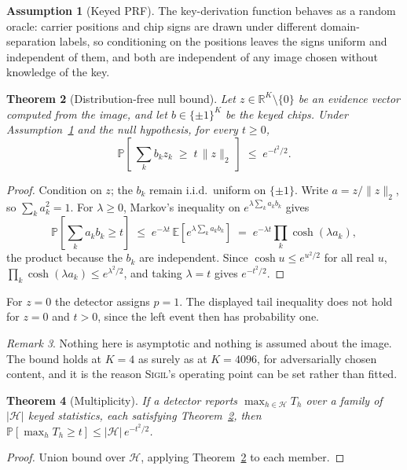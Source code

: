 \documentclass[10pt,twocolumn]{article}
\newtheorem{theorem}{Theorem}
\theoremstyle{definition}
\newtheorem{assumption}[theorem]{Assumption}
\theoremstyle{remark}
\newtheorem{remark}[theorem]{Remark}
\newcommand{\R}{\mathbb{R}}
\newcommand{\E}{\mathbb{E}}
\renewcommand{\Pr}{\mathbb{P}}
\newcommand{\sigil}{\textsc{Sigil}}
\begin{document}
\begin{assumption}[Keyed PRF]
\label{ass:prf}
The key-derivation function behaves as a random oracle: carrier positions and
chip signs are drawn under different domain-separation labels, so conditioning on
the positions leaves the signs uniform and independent of them, and both are
independent of any image chosen without knowledge of the key.
\end{assumption}

\begin{theorem}[Distribution-free null bound]
\label{thm:null}
Let $z\in\R^{K}\setminus\{0\}$ be an evidence vector computed from the image, and let
$b\in\{\pm1\}^{K}$ be the keyed chips. Under Assumption~\ref{ass:prf} and the
null hypothesis, for every $t\geq0$,
\[
  \Pr\!\left[\ \sum_k b_k z_k \;\geq\; t\,\lVert z\rVert_2 \ \right] \;\leq\; e^{-t^{2}/2}.
\]
\end{theorem}

\begin{proof}
Condition on $z$; the $b_k$ remain i.i.d.\ uniform on $\{\pm1\}$. Write
$a=z/\lVert z\rVert_2$, so $\sum_k a_k^2=1$. For $\lambda\geq0$, Markov's
inequality on $e^{\lambda\sum_k a_kb_k}$ gives
\[
  \Pr[\textstyle\sum_k a_kb_k\geq t]
  \;\leq\; e^{-\lambda t}\,\E\!\left[e^{\lambda\sum_k a_kb_k}\right]
  \;=\; e^{-\lambda t}\prod_k \cosh(\lambda a_k),
\]
the product because the $b_k$ are independent. Since
$\cosh u\leq e^{u^{2}/2}$ for all real $u$,
$\prod_k\cosh(\lambda a_k)\leq e^{\lambda^{2}/2}$, and taking $\lambda=t$ gives
$e^{-t^{2}/2}$.
\end{proof}

For $z=0$ the detector assigns $p=1$. The displayed tail inequality does not
hold for $z=0$ and $t>0$, since the left event then has probability one.

\begin{remark}
Nothing here is asymptotic and nothing is assumed about the image. The bound
holds at $K=4$ as surely as at $K=4096$, for adversarially chosen content, and it
is the reason \sigil{}'s operating point can be set rather than fitted.
\end{remark}

\begin{theorem}[Multiplicity]
\label{thm:mult}
If a detector reports $\max_{h\in\mathcal{H}} T_h$ over a family of $|\mathcal{H}|$
keyed statistics, each satisfying Theorem~\ref{thm:null}, then
$\Pr[\max_h T_h \geq t] \leq |\mathcal{H}|\,e^{-t^{2}/2}$.
\end{theorem}
\begin{proof}
Union bound over $\mathcal{H}$, applying Theorem~\ref{thm:null} to each member.
\end{proof}
\end{document}
